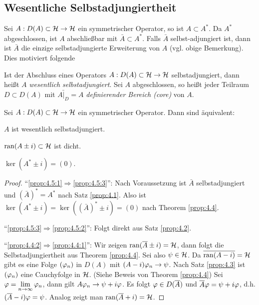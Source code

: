\subsection{Wesentliche Selbstadjungiertheit}

Sei $A: D(A)\subset \mathcal{H}\to\mathcal{H}$ ein symmetrischer Operator, so ist $A\subset
A^*$. Da $A^*$ abgeschlossen, ist $A$ abschließbar mit $\bar{A}\subset A^*$.
Falls $\bar{A}$ selbst-adjungiert ist, dann ist $\bar{A}$ die einzige
selbstadjungierte Erweiterung von $A$ (vgl. obige Bemerkung).
Dies motiviert folgende

\begin{defn*}
Ist der Abschluss eines Operators $A:D(A)\subset\mathcal{H}\to\mathcal{H}$ selbstadjungiert,
dann heißt $A$ \emph{wesentlich selbstadjungiert}. Sei $A$ abgeschlossen, so heißt jeder Teilraum $D\subset
D(A)$ mit $\bar{A\big|_D} = A$ \emph{definierender Bereich (core)} von
$A$.\fishhere
\end{defn*}

\begin{thm}
\label{prop:4.5}
Sei $A: D(A)\subset \mathcal{H}\to \mathcal{H}$ ein symmetrischer Operator. Dann sind
äquivalent:
\begin{propenum}
\item\label{prop:4.5:1} $A$ ist wesentlich selbstadjungiert.
\item\label{prop:4.5:2} $\operatorname{ran}(A\pm i)\subset \mathcal{H}$ ist dicht.
\item\label{prop:4.5:3} $\ker(A^*\pm i) = (0)$.\fishhere
\end{propenum}
\end{thm}
\begin{proof}
``\ref{prop:4.5:1}$\Rightarrow$\ref{prop:4.5:3}'': Nach Voraussetzung
ist $\bar{A}$ selbstadjungiert und $(\bar{A})^* = A^*$ nach Satz
\ref{prop:4.1}. Also ist $\ker(A^*\pm i) = \ker ((\bar{A})^*\pm i) = (0)$ nach
Theorem \ref{prop:4.4}.

``\ref{prop:4.5:3}$\Rightarrow$\ref{prop:4.5:2}'': Folgt direkt aus Satz
\ref{prop:4.2}.

``\ref{prop:4.4:2}$\Rightarrow$\ref{prop:4.4:1}'': Wir zeigen $\operatorname{ran}(\overline{A}\pm
i) = \mathcal{H}$, dann folgt die Selbstadjungiertheit aus Theorem \ref{prop:4.4}. Sei
also $\psi\in \mathcal{H}$. Da $\overline{\operatorname{ran}(A-i)} = \mathcal{H}$ gibt es eine Folge $(\varphi_n)$ in
$D(A)$ mit $(A-i)\varphi_n \to \psi$. Nach Satz \ref{prop:4.3} ist $(\varphi_n)$ eine
Cauchyfolge in $\mathcal{H}$. (Siehe Beweis von Theorem \ref{prop:4.4}) Sei
$\varphi=\lim\limits_{n\to\infty} \varphi_n$, dann gilt $A\varphi_n \to \psi + i\varphi$. Es
folgt $\varphi\in D(\overline{A})$ und $\overline{A}\varphi = \psi+i\varphi$, d.h. $(\overline{A}-i)\varphi =
\psi$.
Analog zeigt man $\operatorname{ran}(\overline{A}+i)=\mathcal{H}$.\qedhere
\end{proof}

